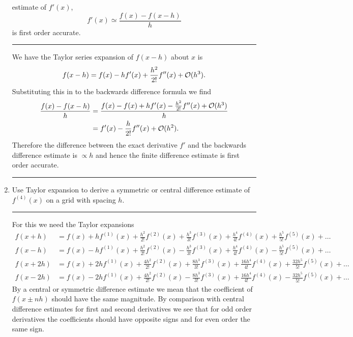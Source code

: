 \documentclass[10pt]{article}
\begin{document}
\begin{enumerate}
  estimate of $f'(x)$,
  \begin{equation*}
    f'(x) \simeq \frac{f(x) - f(x-h)}{h}
  \end{equation*}
  is first order accurate.
  \begin{center}
    \rule{0.9\textwidth}{.1pt}
  \end{center}
  We have the Taylor series expansion of $f(x-h)$ about $x$ is
  \begin{equation*}
    f(x-h) = f(x) - h f'(x) + \frac{h^2}{2!} f''(x) + {\cal O}(h^3).
  \end{equation*}
  Substituting this in to the backwards difference formula we find
  \begin{align*}
    \frac{f(x) - f(x-h)}{h} & = \frac{f(x) - f(x) + h f'(x) -
      \frac{h^2}{2!} f''(x) + {\cal O}(h^3)}{h} \\
    & = f'(x) - \frac{h}{2!} f''(x) + {\cal O}(h^2).
  \end{align*}
  Therefore the difference between the exact derivative $f'$ and the
  backwards difference estimate is $\propto h$ and hence the finite
  difference estimate is first order accurate.
  \begin{center}
    \rule{0.9\textwidth}{.1pt}
  \end{center}
\item Use Taylor expansion to derive a symmetric or central difference
  estimate of $f^{(4)}(x)$ on a grid with spacing $h$.
  \begin{center}
    \rule{0.9\textwidth}{.1pt}
  \end{center}
  For this we need the Taylor expansions
  \begin{align*}
    f(x + h) & = f(x) + h f^{(1)}(x) + \frac{h^2}{2!} f^{(2)}(x) +
    \frac{h^3}{3!} f^{(3)}(x) + \frac{h^4}{4!} f^{(4)}(x) +
    \frac{h^5}{5!} f^{(5)}(x) + \dots \\
    f(x - h) & = f(x) - h f^{(1)}(x) + \frac{h^2}{2!} f^{(2)}(x) -
    \frac{h^3}{3!} f^{(3)}(x) + \frac{h^4}{4!} f^{(4)}(x) -
    \frac{h^5}{5!} f^{(5)}(x) + \dots \\
    f(x + 2 h) & = f(x) + 2 h f^{(1)}(x) + \frac{4 h^2}{2!} f^{(2)}(x) +
    \frac{8 h^3}{3!} f^{(3)}(x) + \frac{16 h^4}{4!} f^{(4)}(x) +
    \frac{32 h^5}{5!} f^{(5)}(x) + \dots \\
    f(x - 2 h) & = f(x) - 2 h f^{(1)}(x) + \frac{4 h^2}{2!} f^{(2)}(x) -
    \frac{8 h^3}{3!} f^{(3)}(x) + \frac{16 h^4}{4!} f^{(4)}(x) -
    \frac{32 h^5}{5!} f^{(5)}(x) + \dots 
  \end{align*}
  By a central or symmetric difference estimate we mean that the
  coefficient of $f(x \pm n h)$ should have the same magnitude. By
  comparison with central difference estimates for first and second
  derivatives we see that for odd order derivatives the coefficients
  should have opposite signs and for even order the same sign.


\end{enumerate}
\end{document}
